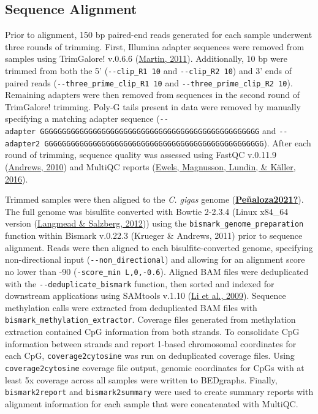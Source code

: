 \documentclass [11pt, proquest] {uwthesis}[2015/03/03]
\begin{document}
\hypertarget{sequence-alignment-2}{%
\subsection{Sequence Alignment}\label{sequence-alignment-2}}

Prior to alignment, 150 bp paired-end reads generated for each sample underwent three rounds of trimming. First, Illumina adapter sequences were removed from samples using TrimGalore! v.0.6.6 (\protect\hyperlink{ref-Martin2011}{Martin, 2011}). Additionally, 10 bp were trimmed from both the 5' (\texttt{-\/-clip\_R1\ 10} and \texttt{-\/-clip\_R2\ 10}) and 3' ends of paired reads (\texttt{-\/-three\_prime\_clip\_R1\ 10} and \texttt{-\/-three\_prime\_clip\_R2\ 10}). Remaining adapters were then removed from sequences in the second round of TrimGalore! trimming. Poly-G tails present in data were removed by manually specifying a matching adapter sequence (\texttt{-\/-adapter\ GGGGGGGGGGGGGGGGGGGGGGGGGGGGGGGGGGGGGGGGGGGGGGGGGG} and \texttt{-\/-adapter2\ GGGGGGGGGGGGGGGGGGGGGGGGGGGGGGGGGGGGGGGGGGGGGGGGGG}). After each round of trimming, sequence quality was assessed using FastQC v.0.11.9 (\protect\hyperlink{ref-Andrews2010}{Andrews, 2010}) and MultiQC reports (\protect\hyperlink{ref-Ewels2016}{Ewels, Magnusson, Lundin, \& Käller, 2016}).

Trimmed samples were then aligned to the \emph{C. gigas} genome (\protect\hyperlink{ref-Peuxf1aloza2021}{\textbf{Peñaloza2021?}}). The full genome was bisulfite converted with Bowtie 2-2.3.4 (Linux x84\_64 version (\protect\hyperlink{ref-Langmead2012}{Langmead \& Salzberg, 2012})) using the \texttt{bismark\_genome\_preparation} function within Bismark v.0.22.3 (Krueger \& Andrews, 2011) prior to sequence alignment. Reads were then aligned to each bisulfite-converted genome, specifying non-directional input (\texttt{-\/-non\_directional}) and allowing for an alignment score no lower than -90 (\texttt{-score\_min\ L,0,-0.6}). Aligned BAM files were deduplicated with the \texttt{-\/-deduplicate\_bismark} function, then sorted and indexed for downstream applications using SAMtools v.1.10 (\protect\hyperlink{ref-Li2009}{Li et al., 2009}). Sequence methylation calls were extracted from deduplicated BAM files with \texttt{bismark\_methylation\_extractor}. Coverage files generated from methylation extraction contained CpG information from both strands. To consolidate CpG information between strands and report 1-based chromosomal coordinates for each CpG, \texttt{coverage2cytosine} was run on deduplicated coverage files. Using \texttt{coverage2cytosine} coverage file output, genomic coordinates for CpGs with at least 5x coverage across all samples were written to BEDgraphs. Finally, \texttt{bismark2report} and \texttt{bismark2summary} were used to create summary reports with alignment information for each sample that were concatenated with MultiQC.
\end{document}
